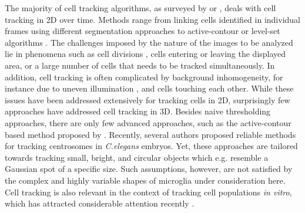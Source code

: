 The majority of cell tracking algorithms, as surveyed by
\cite{Meijering:06} or \cite{Miura:05}, deals with cell tracking in
2D over time. Methods range from linking cells identified in
individual frames using different segmentation approaches to
active-contour \cite{dufour2005segmenting,Shen:06,Sacan:08} or level-set
algorithms \cite{Mukherjee:04,Nath:06,Dzyubachyk:08,Li:08}. The
challenges imposed by the nature of the images to be analyzed lie in
phenomena such as cell divisions \cite{AlKofahi:06,Li:08b}, cells
entering or leaving the displayed area, or a large number of cells
that needs to be tracked simultaneously. In addition, cell tracking is
often complicated by background inhomogeneity, for instance due to
uneven illumination \cite{Leong:03}, and cells touching each
other. While these issues have been addressed extensively for tracking
cells in 2D, surprisingly few approaches have addressed cell tracking
in 3D. Besides naive thresholding approaches, there are only few
advanced approaches, such as the active-contour based method proposed
by \cite{dufour2005segmenting}. Recently, several authors
\cite{Jaensch:10,Kerekes:09} proposed reliable methods for tracking
centrosomes in \emph{C.elegans} embryos. Yet, these approaches are
tailored towards tracking small, bright, and circular objects which
e.g. resemble a Gaussian spot of a specific size. Such assumptions,
however, are not satisfied by the complex and highly variable shapes
of microglia under consideration here. Cell tracking is also relevant
in the context of tracking cell populations \textit{in vitro}, which
has attracted considerable attention recently
\cite{House:09,Padfield:09,Ong:10}.

